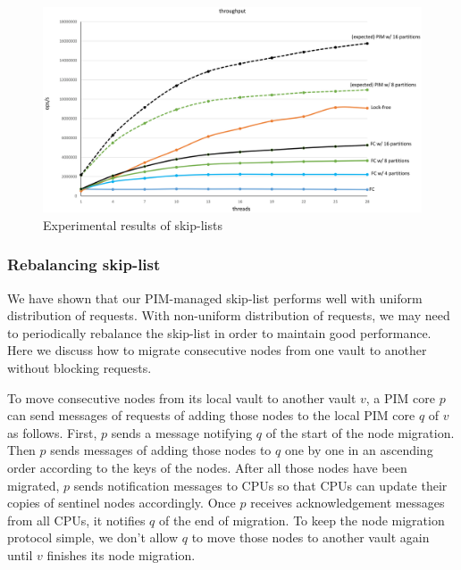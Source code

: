 \documentclass[11pt]{article}
\begin{document}
\begin{figure}[ht!]
\centering
\includegraphics[width=.8\linewidth]{skiplist_data.eps}
\caption{Experimental results of skip-lists}
\label{figure:skiplist_data}
\end{figure}

\subsubsection{Rebalancing skip-list}
We have shown that our PIM-managed skip-list performs well with uniform distribution of requests. 
With non-uniform distribution of requests, we may need to periodically rebalance the skip-list 
in order to maintain good performance. 
Here we discuss how to migrate consecutive nodes from one vault to another without blocking requests.  

To move consecutive nodes from its local vault to another vault $v$, a PIM core $p$ 
can send messages of requests of adding those nodes to the local PIM core $q$ of $v$ as follows. 
First, $p$ sends a message notifying $q$ of the start of the node migration. 
Then $p$ sends messages of adding those nodes to $q$ one by one in an ascending order 
according to the keys of the nodes. 
After all those nodes have been migrated, $p$ sends notification messages to CPUs so that 
CPUs can update their copies of sentinel nodes accordingly.
Once $p$ receives acknowledgement messages from all CPUs, it notifies $q$ of the end of migration.
To keep the node migration protocol simple, we don't allow $q$ to move those nodes 
to another vault again until $v$ finishes its node migration. 
\end{document}
